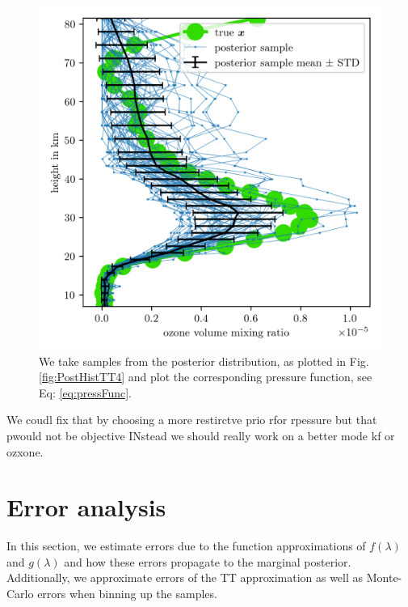 \begin{figure}[ht!]
	\centering
	\includegraphics{FullO3Res.png}
	\caption[Pressure posterior samples.]{We take samples from the posterior distribution, as plotted in Fig. \ref{fig:PostHistTT4} and plot the corresponding pressure function, see Eq: \ref{eq:pressFunc}.}
	\label{fig:O3Post}
\end{figure}
We coudl fix that by choosing a more restirctve prio rfor rpessure but that pwould not be objective 
INstead we should really work on a better mode kf or ozxone.
\clearpage
\section{Error analysis}
In this section, we estimate errors due to the function approximations of $f(\lambda)$ and $g(\lambda)$ and how these errors propagate to the marginal posterior.
Additionally, we approximate errors of the TT approximation as well as Monte-Carlo errors when binning up the samples.


